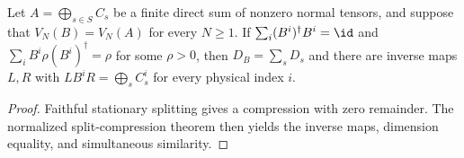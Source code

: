 \begin{corollary}
    \label{thm:asym_faithful_stationary_similarity}
    \leanok
    Let $A=\bigoplus_{s\in S}C_s$ be a finite direct sum of nonzero
    normal tensors, and suppose that $V_N(B)=V_N(A)$ for every $N\geq1$.
    If $\sum_i(B^i)^\dagger B^i=\id$ and
    $\sum_iB^i\rho(B^i)^\dagger=\rho$ for some $\rho>0$, then
    $D_B=\sum_sD_s$ and there are inverse maps $L,R$ with
    $LB^iR=\bigoplus_sC_s^i$ for every physical index $i$.
\end{corollary}

\begin{proof}
    \leanok
    Faithful stationary splitting gives a compression with zero
    remainder. The normalized split-compression theorem then yields
    the inverse maps, dimension equality, and simultaneous similarity.
\end{proof}
